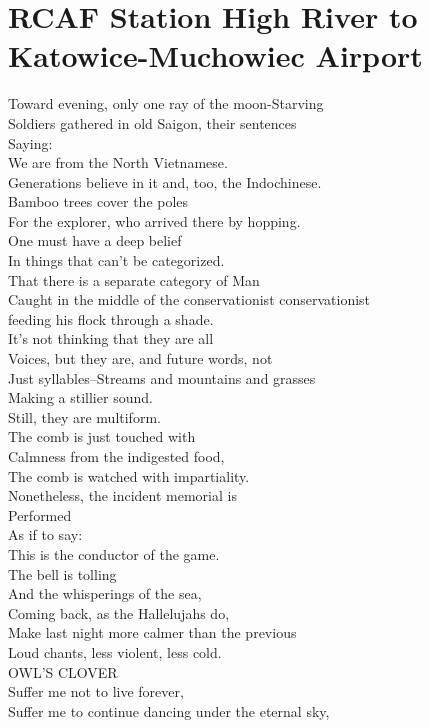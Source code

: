 \documentclass[smalldemyvopaper,11pt,twoside,onecolumn,openright,extrafontsizes]{memoir}
\begin{document}
\chapter{RCAF Station High River to Katowice-Muchowiec Airport}
Toward evening, only one ray of the moon-Starving
\\Soldiers gathered in old Saigon, their sentences
\\Saying:
\\We are from the North Vietnamese.
\\Generations believe in it and, too, the Indochinese.
\\Bamboo trees cover the poles
\\For the explorer, who arrived there by hopping.
\\One must have a deep belief
\\In things that can't be categorized.
\\That there is a separate category of Man
\\Caught in the middle of the conservationist conservationist
\\feeding his flock through a shade.
\\It's not thinking that they are all
\\Voices, but they are, and future words, not
\\Just syllables--Streams and mountains and grasses
\\Making a stillier sound.
\\Still, they are multiform.
\\The comb is just touched with
\\Calmness from the indigested food,
\\The comb is watched with impartiality.
\\Nonetheless, the incident memorial is
\\Performed
\\As if to say:
\\This is the conductor of the game.
\\The bell is tolling
\\And the whisperings of the sea,
\\Coming back, as the Hallelujahs do,
\\Make last night more calmer than the previous
\\Loud chants, less violent, less cold.
\\OWL'S CLOVER
\\Suffer me not to live forever,
\\Suffer me to continue dancing under the eternal sky,
\end{document}
